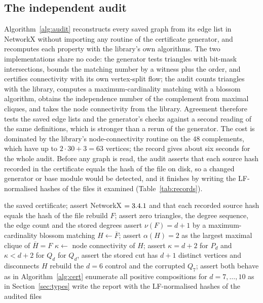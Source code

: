 \documentclass[11pt]{article}
\theoremstyle{remark}
\begin{document}
\subsection{The independent audit}\label{sec:audit}

Algorithm~\ref{alg:audit} reconstructs every saved graph from its edge list in NetworkX without importing any routine of the certificate generator, and recomputes each property with the library's own algorithms. The two implementations share no code: the generator tests triangles with bit-mask intersections, bounds the matching number by a witness plus the order, and certifies connectivity with its own vertex-split flow; the audit counts triangles with the library, computes a maximum-cardinality matching with a blossom algorithm, obtains the independence number of the complement from maximal cliques, and takes the node connectivity from the library. Agreement therefore tests the saved edge lists and the generator's checks against a second reading of the same definitions, which is stronger than a rerun of the generator. The cost is dominated by the library's node-connectivity routine on the $48$ complements, which have up to $2\cdot30+3=63$ vertices; the record gives about six seconds for the whole audit. Before any graph is read, the audit asserts that each source hash recorded in the certificate equals the hash of the file on disk, so a changed generator or base module would be detected, and it finishes by writing the LF-normalised hashes of the files it examined (Table~\ref{tab:records}).

\begin{algorithm}[ht]
\caption{Independent NetworkX audit of the saved certificate.}\label{alg:audit}
\begin{algorithmic}[1]
\Require the saved certificate; assert NetworkX $=3.4.1$ and that each recorded source hash equals the hash of the file
  \State rebuild $F$; assert zero triangles, the degree sequence, the edge count and the stored degrees
  \State assert $\nu(F)=d+1$ by a maximum-cardinality blossom matching
  \State $H\gets\overline F$; assert $\alpha(H)=2$ as the largest maximal clique of $\overline H=F$
  \State $\kappa\gets$ node connectivity of $H$; assert $\kappa=d+2$ for $P_d$ and $\kappa<d+2$ for $Q_d$
  \State for $Q_d$, assert the stored cut has $d+1$ distinct vertices and disconnects $H$
\EndFor
\State rebuild the $d=6$ control and the corrupted $Q_7$; assert both behave as in Algorithm~\ref{alg:cert}
\State enumerate all positive compositions for $d=7,\ldots,10$ as in Section~\ref{sec:types}
\State write the report with the LF-normalised hashes of the audited files
\end{algorithmic}
\end{algorithm}
\end{document}
